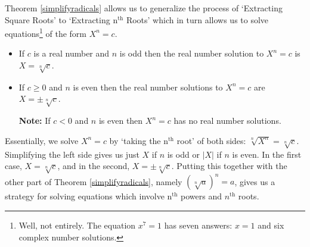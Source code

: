 Theorem \ref{simplifyradicals} allows us to generalize the process of `Extracting Square Roots' to `Extracting $\text{n}^{\text{th}}$ Roots' which in turn allows us to solve equations\footnote{Well, not entirely.  The equation $x^{7} = 1$ has seven answers: $x = 1$ and six complex number solutions. } of the form $X^n  = c$.

\label{extractingnthroots}

\medskip

\colorbox{ResultColor}{\bbm
\begin{thm}

\begin{itemize}

\item If $c$ is a real number and $n$ is odd then the real number solution to $X^{n} = c$ is $X = \sqrt[n]{c}$.

\item  If $c \geq 0$ and $n$ is even then the real number solutions to $X^{n} = c$ are $X = \pm \sqrt[n]{c}$.

\textbf{Note:} If $c < 0$ and $n$ is even then $X^{n} = c$ has no real number solutions.

\end{itemize}
\end{thm}
\ebm}

\medskip

Essentially, we solve $X^{n} = c$ by `taking the $\text{n}^{\text{th}}$ root' of both sides:  $\sqrt[n]{X^{n}} = \sqrt[n]{c}$. Simplifying the left side gives us just $X$ if $n$ is odd or $|X|$ if $n$ is even.  In the first case,  $X =  \sqrt[n]{c}$, and in the second, $X = \pm \sqrt[n]{c}$.  Putting this together with the other part of Theorem \ref{simplifyradicals}, namely $(\sqrt[n]{a})^n = a$, gives us a strategy for solving equations which involve $\text{n}^{\text{th}}$ powers and $n^{\text{th}}$ roots. 

\label{solvepowerandradicaleqns}

\medskip

